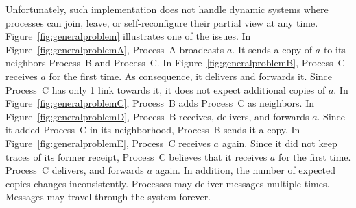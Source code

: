 \begin{figure*}
  \begin{center}
    \hspace{10pt}
    \hspace{10pt}
    \hspace{10pt}
    \hspace{10pt}
    \caption{\label{fig:generalproblem}In dynamic systems, the reliable
      broadcast using counters may deliver messages multiple times leading to
      inconsistencies.}
  \end{center}
\end{figure*}


Unfortunately, such implementation does not handle dynamic systems where
processes can join, leave, or self-reconfigure their partial view at any
time. Figure~\ref{fig:generalproblem} illustrates one of the issues. In
Figure~\ref{fig:generalproblemA}, Process~A broadcasts $a$. It sends a copy of
$a$ to its neighbors Process~B and Process~C. In
Figure~\ref{fig:generalproblemB}, Process~C receives $a$ for the first time.  As
consequence, it delivers and forwards it. Since Process~C has only 1 link
towards it, it does not expect additional copies of $a$. In
Figure~\ref{fig:generalproblemC}, Process~B adds Process~C as neighbors. In
Figure~\ref{fig:generalproblemD}, Process~B receives, delivers, and forwards
$a$. Since it added Process~C in its neighborhood, Process~B sends it a copy.
In Figure~\ref{fig:generalproblemE}, Process~C receives $a$ again. Since it did
not keep traces of its former receipt, Process~C believes that it receives $a$
for the first time. Process~C delivers, and forwards $a$ again. In addition, the
number of expected copies changes inconsistently. Processes may deliver messages
multiple times. Messages may travel through the system forever.

